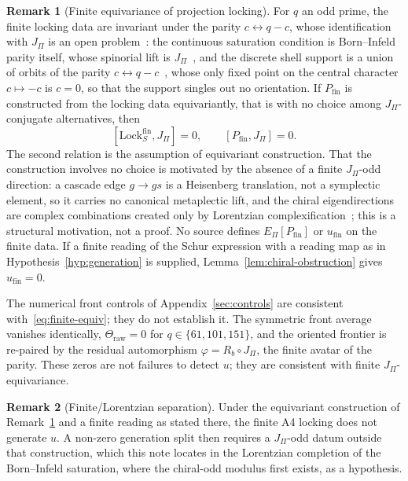 \documentclass[11pt]{article}
\theoremstyle{definition}
\newtheorem{remark}{Remark}
\newcommand{\EPi}{E_\Pi}
\begin{document}
    \begin{remark}[Finite equivariance of projection locking]
      \label{prop:finite-equivariance}
      For $q$ an odd prime, the finite locking data are invariant under the parity $c\leftrightarrow q-c$, whose
      identification with $J_\Pi$ is an open problem~\cite{Beau2026a22}: the continuous saturation condition is
      Born--Infeld parity itself, whose spinorial lift is $J_\Pi$~\cite{Beau2026q14}, and the discrete shell support is
      a union of orbits of the parity
      $c\leftrightarrow q-c$~\cite{Beau2026fe}, whose only fixed point on the central character $c\mapsto-c$ is $c=0$,
      so that the support singles out no orientation.
      If $P_{\mathrm{fin}}$ is constructed from the locking data equivariantly, that is with no choice among
      $J_\Pi$-conjugate alternatives, then
      \begin{equation}
        \label{eq:finite-equiv}
        [\mathrm{Lock}^{\mathrm{fin}}_S,J_\Pi]=0,\qquad [P_{\mathrm{fin}},J_\Pi]=0.
      \end{equation}
      The second relation is the assumption of equivariant construction.
      That the construction involves no choice is motivated by the absence of a finite $J_\Pi$-odd direction: a
      cascade edge $g\to gs$ is a Heisenberg translation, not a symplectic element, so it carries no canonical
      metaplectic lift, and the chiral eigendirections are complex combinations created only by Lorentzian
      complexification~\cite{Beau2026q14}; this is a structural motivation, not a proof.
      No source defines $\EPi[P_{\mathrm{fin}}]$ or $u_{\mathrm{fin}}$ on the finite data.
      If a finite reading of the Schur expression with a reading map as in Hypothesis~\ref{hyp:generation} is supplied,
      Lemma~\ref{lem:chiral-obstruction} gives $u_{\mathrm{fin}}=0$.
    \end{remark}

    The numerical front controls of Appendix~\ref{sec:controls} are consistent with~\eqref{eq:finite-equiv}; they do
    not establish it.
    The symmetric front average vanishes identically, $\Theta_{\mathrm{raw}}=0$ for $q\in\{61,101,151\}$,
    and the oriented frontier is re-paired by the residual automorphism $\varphi=R_b\circ J_\Pi$, the finite
    avatar of the parity.
    These zeros are not failures to detect $u$; they are consistent with finite $J_\Pi$-equivariance.

    \begin{remark}[Finite/Lorentzian separation]
      \label{cor:separation}
      Under the equivariant construction of Remark~\ref{prop:finite-equivariance} and a finite reading as stated there,
      the finite A4 locking does not generate $u$.
      A non-zero generation split then requires a $J_\Pi$-odd datum outside that construction, which this note
      locates in the Lorentzian completion of the Born--Infeld saturation, where the chiral-odd modulus first exists,
      as a hypothesis.
    \end{remark}
\end{document}
